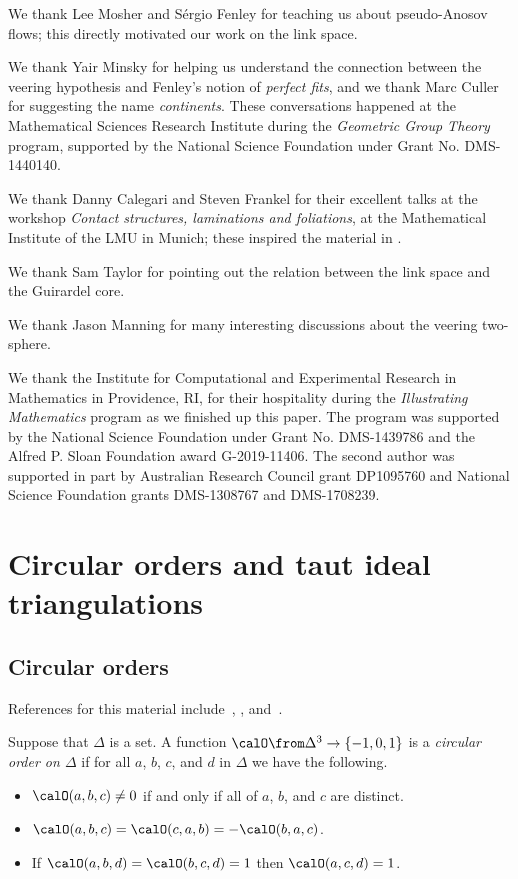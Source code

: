 \documentclass[12pt]{amsart}
\begin{document}
We thank Lee Mosher and S\'ergio Fenley for teaching us about pseudo-Anosov flows; this directly motivated our work on the link space. 

We thank Yair Minsky for helping us understand the connection between the veering hypothesis and Fenley's notion of \emph{perfect fits}, and we thank Marc Culler for suggesting the name \emph{continents}. These conversations happened at the Mathematical Sciences Research Institute during the \emph{Geometric Group Theory} program, supported by the National Science Foundation under Grant No. DMS-1440140. 

We thank Danny Calegari and Steven Frankel for their excellent talks at the workshop \emph{Contact structures, laminations and foliations}, at the Mathematical Institute of the LMU in Munich; these inspired the material in .  

We thank Sam Taylor for pointing out the relation between the link space and the Guirardel core.

We thank Jason Manning for many interesting discussions about the veering two-sphere. 

We thank the Institute for Computational and Experimental Research in Mathematics in Providence, RI, for their hospitality during the \emph{Illustrating Mathematics} program as we finished up this paper.  The program was supported by the National Science Foundation under Grant No. DMS-1439786 and the Alfred P. Sloan Foundation award G-2019-11406. The second author was supported in part by Australian Research Council grant DP1095760 and National Science Foundation grants DMS-1308767 and DMS-1708239.

\section{Circular orders and taut ideal triangulations}
\label{Sec:OrdersTriangulations}

\subsection{Circular orders}
References for this material include~\cite[Section~2]{Thurston98}, \cite[Section~2.6]{Calegari07}, and~\cite[Chapter~3]{Frankel13}.

\begin{definition}
\label{Def:CircularOrder}
Suppose that $\Delta$ is a set.  A function $\calO \from \Delta^3 \to \{-1, 0, 1\}$ is a \emph{circular order on $\Delta$} if for all $a$, $b$, $c$, and $d$ in $\Delta$ we have the following.
\begin{itemize}
\item
$\calO(a, b, c) \neq 0$ if and only if all of $a$, $b$, and $c$ are distinct.
\item
$\calO(a, b, c) = \calO(c, a, b) = -\calO(b, a, c)$.
\item
If $\calO(a, b, d) = \calO(b, c, d) = 1$ then $\calO(a, c, d) = 1$. \qedhere
\end{itemize}
\end{definition}
\end{document}
